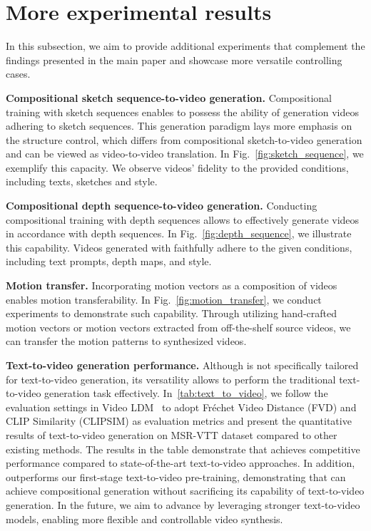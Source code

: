\section{More experimental results} 
\label{sec:more_exp_results}


In this subsection, we aim to provide additional experiments that complement the findings presented in the main paper and showcase more versatile controlling cases.




\textbf{Compositional sketch sequence-to-video generation.}
Compositional training with sketch sequences enables \method to possess the ability of generation videos adhering to sketch sequences.
This generation paradigm lays more emphasis on the structure control, which differs from compositional sketch-to-video generation and can be viewed as video-to-video translation.
In Fig.~\ref{fig:sketch_sequence}, we exemplify this capacity.
We observe videos' fidelity to the provided conditions, including texts, sketches and style.



\textbf{Compositional depth sequence-to-video generation.}
Conducting compositional training with depth sequences allows \method to effectively generate videos in accordance with depth sequences.
In Fig.~\ref{fig:depth_sequence}, we illustrate this capability.
Videos generated with \method faithfully adhere to the given conditions, including text prompts, depth maps, and style.


\textbf{Motion transfer.}
Incorporating motion vectors as a composition of videos enables motion transferability.
In Fig.~\ref{fig:motion_transfer}, we conduct experiments to demonstrate such capability.
Through utilizing hand-crafted motion vectors or motion vectors extracted from off-the-shelf source videos, we can transfer the motion patterns to synthesized videos.

\textbf{Text-to-video generation performance.}
Although \method is not specifically tailored for text-to-video generation, its versatility allows \method to perform the traditional text-to-video generation task effectively.
In~\cref{tab:text_to_video}, we follow the evaluation settings in Video LDM~\cite{blattmann2023align_latents} to adopt Fréchet Video Distance (FVD) and CLIP Similarity (CLIPSIM) as evaluation metrics and present the quantitative results of text-to-video generation on MSR-VTT dataset compared to other existing methods.
The results in the table demonstrate that \method achieves competitive performance compared to state-of-the-art text-to-video approaches.
In addition,
\method outperforms our first-stage text-to-video pre-training, demonstrating that \method can achieve compositional generation without sacrificing its capability of text-to-video generation.
In the future, we aim to advance \method by leveraging stronger text-to-video models, enabling more flexible and controllable video synthesis.


